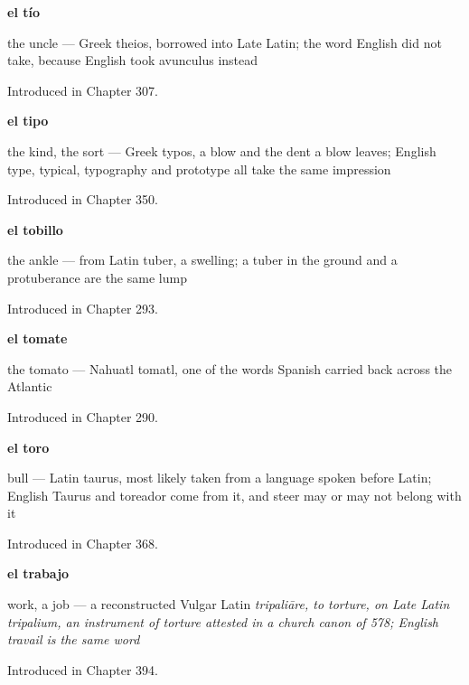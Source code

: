 \noindent\begin{minipage}[t]{\linewidth}
\raggedright
\textbf{el tío}\par
\small the uncle --- Greek theios, borrowed into Late Latin; the word English did not take, because English took avunculus instead\par
\footnotesize Introduced in Chapter 307.
\end{minipage}\par\medskip

\noindent\begin{minipage}[t]{\linewidth}
\raggedright
\textbf{el tipo}\par
\small the kind, the sort — Greek typos, a blow and the dent a blow leaves; English type, typical, typography and prototype all take the same impression\par
\footnotesize Introduced in Chapter 350.
\end{minipage}\par\medskip

\noindent\begin{minipage}[t]{\linewidth}
\raggedright
\textbf{el tobillo}\par
\small the ankle — from Latin tuber, a swelling; a tuber in the ground and a protuberance are the same lump\par
\footnotesize Introduced in Chapter 293.
\end{minipage}\par\medskip

\noindent\begin{minipage}[t]{\linewidth}
\raggedright
\textbf{el tomate}\par
\small the tomato — Nahuatl tomatl, one of the words Spanish carried back across the Atlantic\par
\footnotesize Introduced in Chapter 290.
\end{minipage}\par\medskip

\noindent\begin{minipage}[t]{\linewidth}
\raggedright
\textbf{el toro}\par
\small bull — Latin taurus, most likely taken from a language spoken before Latin; English Taurus and toreador come from it, and steer may or may not belong with it\par
\footnotesize Introduced in Chapter 368.
\end{minipage}\par\medskip

\noindent\begin{minipage}[t]{\linewidth}
\raggedright
\textbf{el trabajo}\par
\small work, a job — a reconstructed Vulgar Latin \emph{tripaliāre, to torture, on Late Latin tripalium, an instrument of torture attested in a church canon of 578; English travail is the same word}\par
\footnotesize Introduced in Chapter 394.
\end{minipage}\par\medskip

